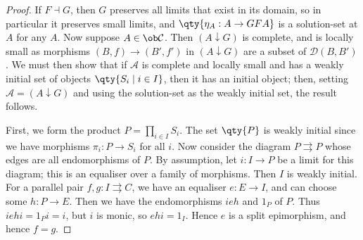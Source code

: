 \begin{proof}
    If \( F \dashv G \), then \( G \) preserves all limits that exist in its domain, so in particular it preserves small limits, and \( \qty{\eta_A : A \to GFA} \) is a solution-set at \( A \) for any \( A \).
    Now suppose \( A \in \ob \mathcal C \).
    Then \( (A \downarrow G) \) is complete, and is locally small as morphisms \( (B, f) \to (B', f') \) in \( (A \downarrow G) \) are a subset of \( \mathcal D(B, B') \).
    We must then show that if \( \mathcal A \) is complete and locally small and has a weakly initial set of objects \( \qty{S_i \mid i \in I} \), then it has an initial object; then, setting \( \mathcal A = (A \downarrow G) \) and using the solution-set as the weakly initial set, the result follows.

    First, we form the product \( P = \prod_{i \in I} S_i \).
    The set \( \qty{P} \) is weakly initial since we have morphisms \( \pi_i : P \to S_i \) for all \( i \).
    Now consider the diagram \( P \rightrightarrows P \) whose edges are all endomorphisms of \( P \).
    By assumption, let \( i : I \to P \) be a limit for this diagram; this is an equaliser over a family of morphisms.
    Then \( I \) is weakly initial.
    For a parallel pair \( f, g : I \rightrightarrows C \), we have an equaliser \( e : E \to I \), and can choose some \( h : P \to E \).
    Then we have the endomorphisms \( ieh \) and \( 1_P \) of \( P \).
    Thus \( iehi = 1_P i = i \), but \( i \) is monic, so \( ehi = 1_I \).
    Hence \( e \) is a split epimorphism, and hence \( f = g \).
\end{proof}
